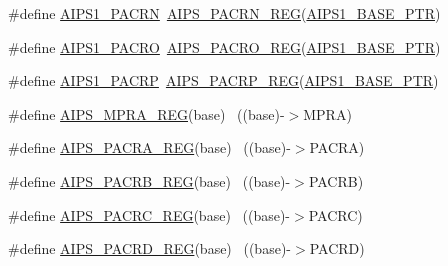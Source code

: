 \begin{DoxyCompactItemize}
\item 
\#define \hyperlink{group___a_i_p_s___register___accessor___macros_gad9fccad02ee0ca573f43b80d2d57108d}{A\+I\+P\+S1\+\_\+\+P\+A\+C\+RN}~\hyperlink{group___a_i_p_s___register___accessor___macros_gaa794b17b9de6a81bd01fc3bdeeafc5b2}{A\+I\+P\+S\+\_\+\+P\+A\+C\+R\+N\+\_\+\+R\+EG}(\hyperlink{group___a_i_p_s___peripheral_gab38278851053aa66f9683ed8707e23bc}{A\+I\+P\+S1\+\_\+\+B\+A\+S\+E\+\_\+\+P\+TR})
\item 
\#define \hyperlink{group___a_i_p_s___register___accessor___macros_ga52d5b9830bfd7cbaaba6599ceb788a74}{A\+I\+P\+S1\+\_\+\+P\+A\+C\+RO}~\hyperlink{group___a_i_p_s___register___accessor___macros_ga41ac26d457af78568e03b65f4ed71c71}{A\+I\+P\+S\+\_\+\+P\+A\+C\+R\+O\+\_\+\+R\+EG}(\hyperlink{group___a_i_p_s___peripheral_gab38278851053aa66f9683ed8707e23bc}{A\+I\+P\+S1\+\_\+\+B\+A\+S\+E\+\_\+\+P\+TR})
\item 
\#define \hyperlink{group___a_i_p_s___register___accessor___macros_gad8012e5cb4cf7d6dfb0e76e11974d4d0}{A\+I\+P\+S1\+\_\+\+P\+A\+C\+RP}~\hyperlink{group___a_i_p_s___register___accessor___macros_gadf1bac253f22b305685fdd87564a7660}{A\+I\+P\+S\+\_\+\+P\+A\+C\+R\+P\+\_\+\+R\+EG}(\hyperlink{group___a_i_p_s___peripheral_gab38278851053aa66f9683ed8707e23bc}{A\+I\+P\+S1\+\_\+\+B\+A\+S\+E\+\_\+\+P\+TR})
\item 
\#define \hyperlink{group___a_i_p_s___register___accessor___macros_ga152616308133cf4081eccd2218dcc92f}{A\+I\+P\+S\+\_\+\+M\+P\+R\+A\+\_\+\+R\+EG}(base)                                        ~((base)-\/$>$M\+P\+RA)
\item 
\#define \hyperlink{group___a_i_p_s___register___accessor___macros_ga34c1a4290c1592d146062320c02a9a6a}{A\+I\+P\+S\+\_\+\+P\+A\+C\+R\+A\+\_\+\+R\+EG}(base)                                      ~((base)-\/$>$P\+A\+C\+RA)
\item 
\#define \hyperlink{group___a_i_p_s___register___accessor___macros_ga9ef244a0063130484f0c49a3d504fc5b}{A\+I\+P\+S\+\_\+\+P\+A\+C\+R\+B\+\_\+\+R\+EG}(base)                                      ~((base)-\/$>$P\+A\+C\+RB)
\item 
\#define \hyperlink{group___a_i_p_s___register___accessor___macros_ga78c7a08f917ec00d68544b8463bbb06b}{A\+I\+P\+S\+\_\+\+P\+A\+C\+R\+C\+\_\+\+R\+EG}(base)                                      ~((base)-\/$>$P\+A\+C\+RC)
\item 
\#define \hyperlink{group___a_i_p_s___register___accessor___macros_ga60f95b6f529c1f86b3fa90f2dfabe604}{A\+I\+P\+S\+\_\+\+P\+A\+C\+R\+D\+\_\+\+R\+EG}(base)                                      ~((base)-\/$>$P\+A\+C\+RD)

\end{DoxyCompactItemize}
